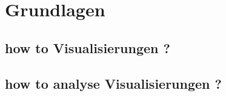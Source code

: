 \chapter[Grundlagen]{Grundlagen}

\section[how to Visualisierungen ?]{how to Visualisierungen ?}
\section[how to analyse Visualisierungen ?]{how to analyse Visualisierungen ?}
